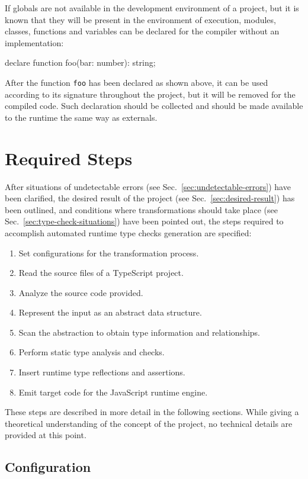 If globals are not available in the development environment of a project, but it is known that they will be present in the environment of execution, modules, classes, functions and variables can be declared for the compiler without an implementation:
\begin{JsCode}[numbers=none]
declare function foo(bar: number): string;
\end{JsCode}
After the function \texttt{foo} has been declared as shown above, it can be used according to its signature throughout the project, but it will be removed for the compiled code. Such declaration should be collected and should be made available to the runtime the same way as externals.

\section{Required Steps}
\label{sec:required-steps}

After situations of undetectable errors (see Sec.~\ref{sec:undetectable-errors}) have been clarified, the desired result of the project (see Sec.~\ref{sec:desired-result}) has been outlined, and conditions where transformations should take place (see Sec.~\ref{sec:type-check-situations}) have been pointed out, the steps required to accomplish automated runtime type checks generation are specified:
\begin{enumerate}
  \item Set configurations for the transformation process.
  \item Read the source files of a TypeScript project.
  \item Analyze the source code provided.
  \item Represent the input as an abstract data structure.
  \item Scan the abstraction to obtain type information and relationships.
  \item Perform static type analysis and checks.
  \item Insert runtime type reflections and assertions.
  \item Emit target code for the JavaScript runtime engine.
\end{enumerate}
These steps are described in more detail in the following sections. While giving a theoretical understanding of the concept of the project, no technical details are provided at this point.

\subsection{Configuration}
\label{sec:steps-configuration}

